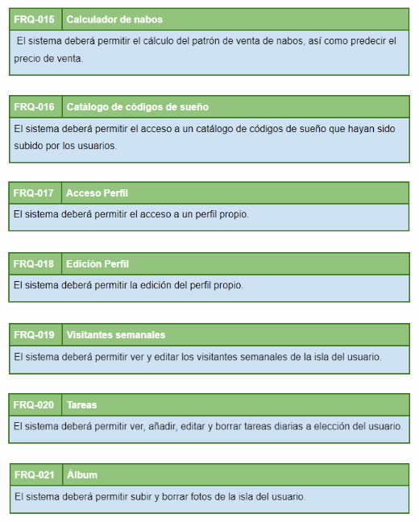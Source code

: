 	\bigskip
	
	\includegraphics[width=\textwidth]{img/cap5/FR/15.png}
	
	\bigskip
	
	\includegraphics[width=\textwidth]{img/cap5/FR/16.png}
	
	\bigskip
	
	\includegraphics[width=\textwidth]{img/cap5/FR/17.png}
	
	\bigskip
	
	\includegraphics[width=\textwidth]{img/cap5/FR/18.png}
	
	\bigskip
	
	\includegraphics[width=\textwidth]{img/cap5/FR/19.png}
	
	\bigskip
	
	\includegraphics[width=\textwidth]{img/cap5/FR/20.png}
	
	\bigskip
	
	\includegraphics[width=\textwidth]{img/cap5/FR/21.png}
	
